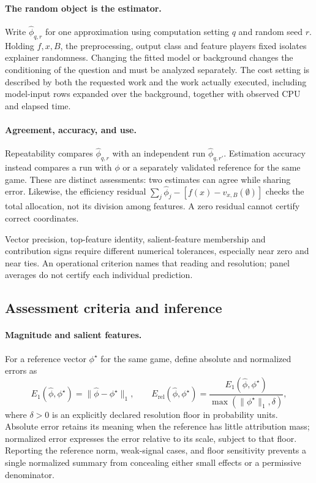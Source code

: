 \paragraph{The random object is the estimator.}
Write $\widehat\phi_{q,r}$ for one approximation using computation setting $q$ and random seed $r$. Holding $f,x,B$, the preprocessing, output class and feature players fixed isolates explainer randomness. Changing the fitted model or background changes the conditioning of the question and must be analyzed separately. The cost setting is described by both the requested work and the work actually executed, including model-input rows expanded over the background, together with observed CPU and elapsed time.

\paragraph{Agreement, accuracy, and use.}
Repeatability compares $\widehat\phi_{q,r}$ with an independent run $\widehat\phi_{q,r'}$. Estimation accuracy instead compares a run with $\phi$ or a separately validated reference for the same game. These are distinct assessments: two estimates can agree while sharing error. Likewise, the efficiency residual
$\sum_j\widehat\phi_j-[f(x)-v_{x,B}(\emptyset)]$
checks the total allocation, not its division among features. A zero residual cannot certify correct coordinates.

Vector precision, top-feature identity, salient-feature membership and contribution signs require different numerical tolerances, especially near zero and near ties. An operational criterion names that reading and resolution; panel averages do not certify each individual prediction.

\subsection{Assessment criteria and inference}
\label{app:assessment}

\paragraph{Magnitude and salient features.}
For a reference vector $\phi^\star$ for the same game, define absolute and normalized errors as
\begin{equation}
 E_1(\widehat\phi,\phi^\star)=\|\widehat\phi-\phi^\star\|_1,
 \qquad
 E_{\mathrm{rel}}(\widehat\phi,\phi^\star)
 =\frac{E_1(\widehat\phi,\phi^\star)}{\max(\|\phi^\star\|_1,\delta)},
 \label{eq:error}
\end{equation}
where $\delta>0$ is an explicitly declared resolution floor in probability units. Absolute error retains its meaning when the reference has little attribution mass; normalized error expresses the error relative to its scale, subject to that floor. Reporting the reference norm, weak-signal cases, and floor sensitivity prevents a single normalized summary from concealing either small effects or a permissive denominator.

